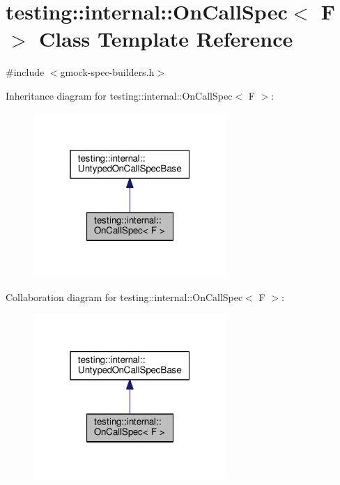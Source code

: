 \hypertarget{classtesting_1_1internal_1_1OnCallSpec}{}\section{testing\+:\+:internal\+:\+:On\+Call\+Spec$<$ F $>$ Class Template Reference}
\label{classtesting_1_1internal_1_1OnCallSpec}


{\ttfamily \#include $<$gmock-\/spec-\/builders.\+h$>$}



Inheritance diagram for testing\+:\+:internal\+:\+:On\+Call\+Spec$<$ F $>$\+:\nopagebreak
\begin{figure}[H]
\begin{center}
\leavevmode
\includegraphics[width=208pt]{classtesting_1_1internal_1_1OnCallSpec__inherit__graph}
\end{center}
\end{figure}


Collaboration diagram for testing\+:\+:internal\+:\+:On\+Call\+Spec$<$ F $>$\+:\nopagebreak
\begin{figure}[H]
\begin{center}
\leavevmode
\includegraphics[width=208pt]{classtesting_1_1internal_1_1OnCallSpec__coll__graph}
\end{center}
\end{figure}
